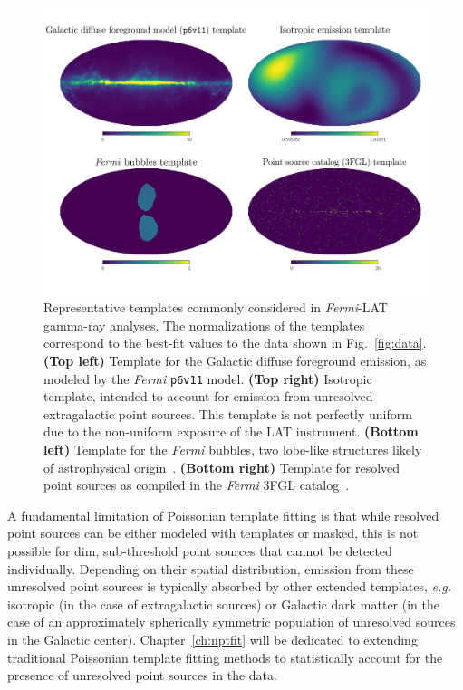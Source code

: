 \begin{figure}[htbp] 
\centering
 \includegraphics[width=1.0\textwidth]{ch-intro/templates_red.pdf}
\caption{Representative templates commonly considered in \emph{Fermi}-LAT gamma-ray analyses. The normalizations of the templates correspond to the best-fit values to the data shown in Fig.~\ref{fig:data}. \textbf{(Top left)} Template for the Galactic diffuse foreground emission, as modeled by the  {\it Fermi} \texttt{p6v11} model. \textbf{(Top right)} Isotropic template, intended to account for emission from unresolved extragalactic point sources. This template is not perfectly uniform due to the non-uniform exposure of the LAT instrument. \textbf{(Bottom left)} Template for the \emph{Fermi} bubbles, two lobe-like structures likely of astrophysical origin~\cite{Su:2010qj,Fermi-LAT:2014sfa}. \textbf{(Bottom right)} Template for resolved point sources as compiled in the \emph{Fermi} 3FGL catalog~\cite{Acero:2015hja}.}  
\label{fig:templates}
\end{figure}

A fundamental limitation of Poissonian template fitting is that while resolved point sources can be either modeled with templates or masked, this is not possible for dim, sub-threshold point sources that cannot be detected individually. Depending on their spatial distribution, emission from these unresolved point sources is typically absorbed by other extended templates, \emph{e.g.} isotropic (in the case of extragalactic sources) or Galactic dark matter (in the case of an approximately spherically symmetric population of unresolved sources in the Galactic center). Chapter~\ref{ch:nptfit} will be dedicated to extending traditional Poissonian template fitting methods to statistically account for the presence of unresolved point sources in the data.

